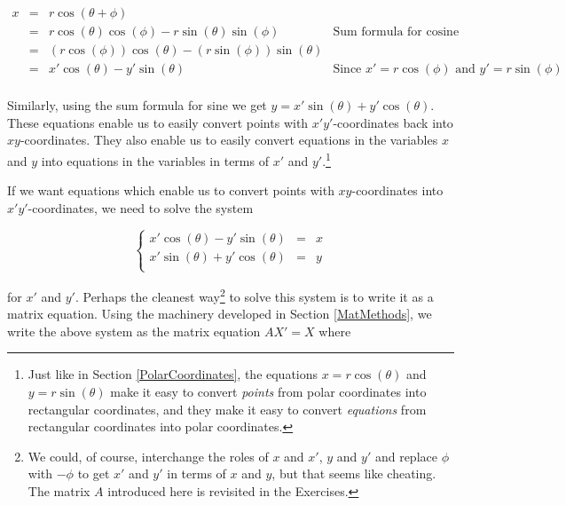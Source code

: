 \documentclass{ximera}
\begin{document}
\[ \begin{array}{rcll}

x & = & r\cos(\theta + \phi) & \\ 
  & = & r\cos(\theta)\cos(\phi) - r\sin(\theta) \sin(\phi) & \text{Sum formula for cosine} \\ 
  & = & (r\cos(\phi))\cos(\theta) - (r\sin(\phi))\sin(\theta) & \\ 
  & = & x' \cos(\theta) - y' \sin(\theta) & \text{Since $x' = r\cos(\phi)$ and $y' = r\sin(\phi)$}\\ \end{array}\]

Similarly, using the sum formula for sine we get $y = x'\sin(\theta) + y'\cos(\theta)$.  These equations enable us to easily convert points with $x'y'$-coordinates back into $xy$-coordinates.  They also enable us to easily convert equations in the variables $x$ and $y$ into equations in the variables in terms of $x'$ and $y'$.\footnote{Just like in Section \ref{PolarCoordinates}, the equations $x = r\cos(\theta)$ and $y = r\sin(\theta)$ make it easy to convert \textit{points} from polar coordinates into rectangular coordinates, and they make it easy to convert \textit{equations} from rectangular coordinates into polar coordinates.}  

 

If we want equations which enable us to convert points with $xy$-coordinates into $x'y'$-coordinates, we need to solve the system


\[ \left\{ \begin{array}{rcl} x' \cos(\theta) - y' \sin(\theta) & = & x \\ x'\sin(\theta) + y'\cos(\theta) & = & y \\ \end{array} \right.\]

for $x'$ and $y'$. Perhaps the cleanest way\footnote{We could, of course, interchange the roles of $x$ and $x'$, $y$ and $y'$ and replace $\phi$ with $-\phi$ to get $x'$ and $y'$ in terms of $x$ and $y$, but that seems like cheating.  The matrix $A$ introduced here is revisited in the Exercises.} to solve this system is to write it as a matrix equation. Using the machinery developed in Section \ref{MatMethods}, we write the above system as the matrix equation $AX' = X$ where
\end{document}
